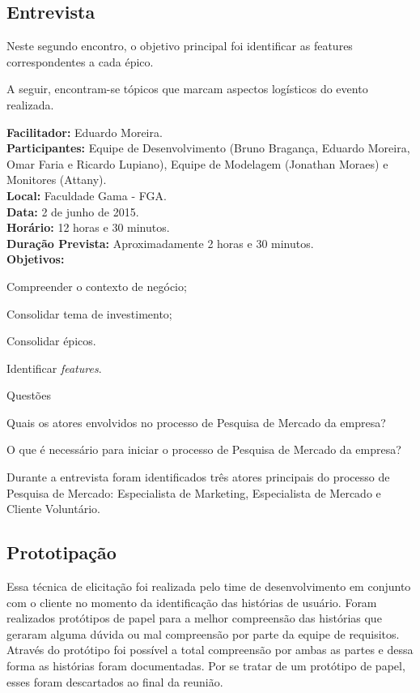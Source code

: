 	\subsection{Entrevista}

		Neste segundo encontro, o objetivo principal foi identificar as features correspondentes a cada épico.
		
		A seguir, encontram-se tópicos que marcam aspectos logísticos do evento realizada.

		\noindent
		\textbf{Facilitador: }Eduardo Moreira.\\
		\textbf{Participantes: }Equipe de Desenvolvimento (Bruno Bragança, Eduardo Moreira, Omar Faria e Ricardo Lupiano), Equipe de Modelagem (Jonathan Moraes) e Monitores (Attany).\\
		\textbf{Local: }Faculdade Gama - FGA.\\
		\textbf{Data: }2 de junho de 2015.\\
		\textbf{Horário: }12 horas e 30 minutos.\\
		\textbf{Duração Prevista: }Aproximadamente 2 horas e 30 minutos.\\
		\textbf{Objetivos:}
		\begin{itemize}
		{
			\item Compreender o contexto de negócio;
			\item Consolidar tema de investimento;
			\item Consolidar épicos.
			\item Identificar \textit{features}.
		}
		\end{itemize}

		\noindent
		Questões
		\begin{itemize}
		{
			\item Quais os atores envolvidos no processo de Pesquisa de Mercado da empresa?
			\item O que é necessário para iniciar o processo de Pesquisa de Mercado da empresa?
		}
		\end{itemize}

		Durante a entrevista foram identificados três atores principais do processo de Pesquisa de Mercado: Especialista de Marketing, Especialista de Mercado e Cliente Voluntário.

	\subsection{Prototipação}

		Essa técnica de elicitação foi realizada pelo time de desenvolvimento em conjunto com o cliente no momento da identificação das histórias de usuário. Foram realizados protótipos de papel para a melhor compreensão das histórias que geraram alguma dúvida ou mal compreensão por parte da equipe de requisitos. Através do protótipo foi possível a total compreensão por ambas as partes e dessa forma as histórias foram documentadas. Por se tratar de um protótipo de papel, esses foram descartados ao final da reunião.
